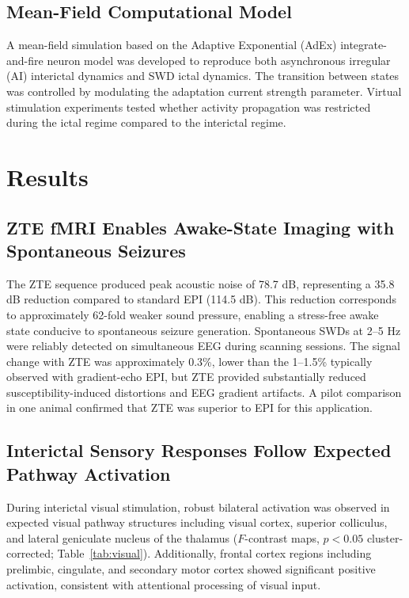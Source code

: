 \documentclass[12pt]{article}
\begin{document}
\subsection{Mean-Field Computational Model}

A mean-field simulation based on the Adaptive Exponential (AdEx) integrate-and-fire neuron model \citep{brette2005adaptive} was developed to reproduce both asynchronous irregular (AI) interictal dynamics and SWD ictal dynamics. The transition between states was controlled by modulating the adaptation current strength parameter. Virtual stimulation experiments tested whether activity propagation was restricted during the ictal regime compared to the interictal regime.

\section{Results}

\subsection{ZTE fMRI Enables Awake-State Imaging with Spontaneous Seizures}

The ZTE sequence produced peak acoustic noise of 78.7 dB, representing a 35.8 dB reduction compared to standard EPI (114.5 dB). This reduction corresponds to approximately 62-fold weaker sound pressure, enabling a stress-free awake state conducive to spontaneous seizure generation. Spontaneous SWDs at 2--5 Hz were reliably detected on simultaneous EEG during scanning sessions. The signal change with ZTE was approximately 0.3\%, lower than the 1--1.5\% typically observed with gradient-echo EPI, but ZTE provided substantially reduced susceptibility-induced distortions and EEG gradient artifacts. A pilot comparison in one animal confirmed that ZTE was superior to EPI for this application.

\subsection{Interictal Sensory Responses Follow Expected Pathway Activation}

During interictal visual stimulation, robust bilateral activation was observed in expected visual pathway structures including visual cortex, superior colliculus, and lateral geniculate nucleus of the thalamus ($F$-contrast maps, $p < 0.05$ cluster-corrected; Table~\ref{tab:visual}). Additionally, frontal cortex regions including prelimbic, cingulate, and secondary motor cortex showed significant positive activation, consistent with attentional processing of visual input.
\end{document}
